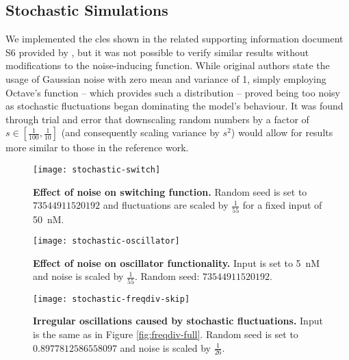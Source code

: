   \subsection{Stochastic Simulations}


    We implemented the \ac{cles} shown in the related supporting information document S6 provided by \citet{multif}, but it was not possible to verify similar results without modifications to the noise-inducing function.
    While original authors state the usage of Gaussian noise with zero mean and variance of 1, simply employing Octave's  function -- which provides such a distribution \cite{randn} -- proved being too noisy as stochastic fluctuations began dominating the model's behaviour.
    It was found through trial and error that downscaling random numbers by a factor of $s \in [\frac{1}{100}, \frac{1}{10}]$ (and consequently scaling variance by $s^2$) would allow for results more similar to those in the reference work.

    \begin{figure}[!htb]
      \centering
      \texttt{[image: stochastic-switch]}
      \caption{\textbf{Effect of noise on switching function.} Random seed is set to $73544911520192$ and fluctuations are scaled by $\frac{1}{55}$ for a fixed input of \SI{50}{\nano M}.}
      \label{fig:stochastic-switch}
    \end{figure}

    \begin{figure}[!htb]
      \centering
      \texttt{[image: stochastic-oscillator]}
      \caption{\textbf{Effect of noise on oscillator functionality.} Input is set to \SI{5}{\nano M} and noise is scaled by $\frac{1}{55}$. Random seed: $73544911520192$.}
      \label{fig:stochastic-oscillator}
    \end{figure}

    \begin{figure}[!htbp]
      \centering
      \texttt{[image: stochastic-freqdiv-skip]}
      \caption{\textbf{Irregular oscillations caused by stochastic fluctuations.} Input is the same as in Figure \ref{fig:freqdiv-full}. Random seed is set to $0.8977812586558097$ and noise is scaled by $\frac{1}{26}$.}
      \label{fig:stochastic-freqdiv-skip}
    \end{figure}

